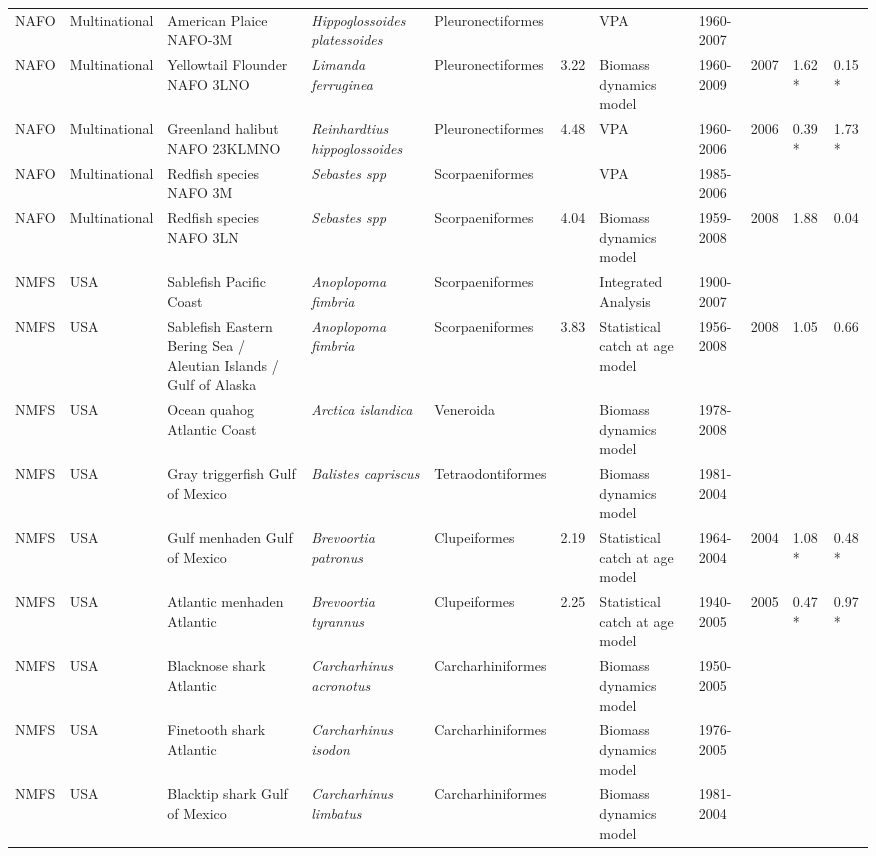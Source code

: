 \begin{longtable}{p{1.5cm}p{1.5cm}p{3cm}p{3cm}p{2.5cm}p{0.9cm}p{1.4cm}p{0.9cm}p{0.9cm}p{0.9cm}p{1cm}}
  NAFO & Multinational & American Plaice NAFO-3M & \textit{Hippoglossoides platessoides} & Pleuronectiformes &  & VPA & 1960-2007 &  &  &  \\ 
  NAFO & Multinational & Yellowtail Flounder NAFO 3LNO & \textit{Limanda ferruginea} & Pleuronectiformes & 3.22 & Biomass dynamics model & 1960-2009 & 2007 & 1.62 * & 0.15 * \\ 
  NAFO & Multinational & Greenland halibut NAFO 23KLMNO & \textit{Reinhardtius hippoglossoides} & Pleuronectiformes & 4.48 & VPA & 1960-2006 & 2006 & 0.39 * & 1.73 * \\ 
  NAFO & Multinational & Redfish species NAFO 3M & \textit{Sebastes spp} & Scorpaeniformes &  & VPA & 1985-2006 &  &  &  \\ 
  NAFO & Multinational & Redfish species NAFO 3LN & \textit{Sebastes spp} & Scorpaeniformes & 4.04 & Biomass dynamics model & 1959-2008 & 2008 & 1.88 & 0.04 \\ 
  NMFS & USA & Sablefish Pacific Coast & \textit{Anoplopoma fimbria} & Scorpaeniformes &  & Integrated Analysis & 1900-2007 &  &  &  \\ 
  NMFS & USA & Sablefish Eastern Bering Sea / Aleutian Islands / Gulf of Alaska & \textit{Anoplopoma fimbria} & Scorpaeniformes & 3.83 & Statistical catch at age model & 1956-2008 & 2008 & 1.05 & 0.66 \\ 
  NMFS & USA & Ocean quahog Atlantic Coast & \textit{Arctica islandica} & Veneroida &  & Biomass dynamics model & 1978-2008 &  &  &  \\ 
  NMFS & USA & Gray triggerfish Gulf of Mexico & \textit{Balistes capriscus} & Tetraodontiformes &  & Biomass dynamics model & 1981-2004 &  &  &  \\ 
  NMFS & USA & Gulf menhaden Gulf of Mexico & \textit{Brevoortia patronus} & Clupeiformes & 2.19 & Statistical catch at age model & 1964-2004 & 2004 & 1.08 * & 0.48 * \\ 
  NMFS & USA & Atlantic menhaden Atlantic & \textit{Brevoortia tyrannus} & Clupeiformes & 2.25 & Statistical catch at age model & 1940-2005 & 2005 & 0.47 * & 0.97 * \\ 
  NMFS & USA & Blacknose shark Atlantic & \textit{Carcharhinus acronotus} & Carcharhiniformes &  & Biomass dynamics model & 1950-2005 &  &  &  \\ 
  NMFS & USA & Finetooth shark Atlantic & \textit{Carcharhinus isodon} & Carcharhiniformes &  & Biomass dynamics model & 1976-2005 &  &  &  \\ 
  NMFS & USA & Blacktip shark Gulf of Mexico & \textit{Carcharhinus limbatus} & Carcharhiniformes &  & Biomass dynamics model & 1981-2004 &  &  &  \\ 

\end{longtable}

